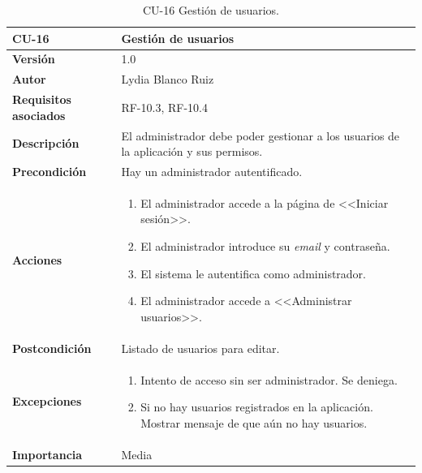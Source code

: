 \begin{table}[p]
	\centering
	\begin{tabularx}{\linewidth}{ p{} p{} }
		\toprule
		\textbf{CU-16}    & \textbf{ Gestión de usuarios}\\
		\toprule
		\textbf{Versión}              & 1.0    \\
		\textbf{Autor}                & Lydia Blanco Ruiz \\
		\textbf{Requisitos asociados} & RF-10.3, RF-10.4 \\
		\textbf{Descripción}          & El administrador debe poder gestionar a los usuarios de la aplicación y sus permisos. \\
		\textbf{Precondición}         & Hay un administrador autentificado. \\
		\textbf{Acciones}             &
		\begin{enumerate}
			\def\labelenumi{\arabic{enumi}.}
			\tightlist
			\item El administrador accede a la página de <<Iniciar sesión>>.
			\item El administrador introduce su \textit{email} y contraseña.
			\item El sistema le autentifica como administrador.
			\item El administrador accede a <<Administrar usuarios>>.
		\end{enumerate}\\
		\textbf{Postcondición}        & Listado de usuarios para editar. \\
		\textbf{Excepciones}          & 
		\begin{enumerate}
			\def\labelenumi{\arabic{enumi}.}
			\tightlist
			\item Intento de acceso sin ser administrador. Se deniega.
			\item Si no hay usuarios registrados en la aplicación. Mostrar mensaje de que aún no hay usuarios.
		\end{enumerate}\\
		\textbf{Importancia}          & Media  \\
		\bottomrule
	\end{tabularx}
	\caption{CU-16 Gestión de usuarios.}
\end{table}

